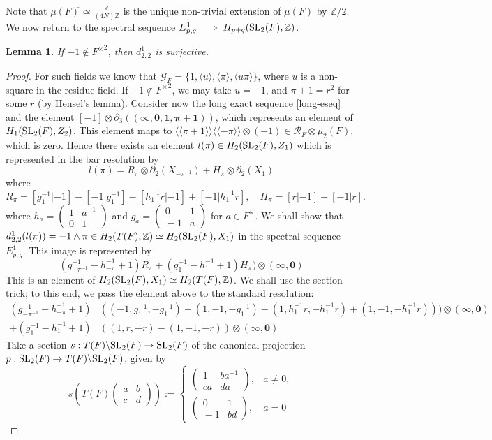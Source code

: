 \documentclass[11pt]{amsart}
\theoremstyle{definition}
\theoremstyle{plain}
\newtheorem{lem}[ntn]{Lemma}
\numberwithin{equation}{section}
\newcommand{\z}{\mathbb{Z}}
\newcommand{\GG}{\mathcal{G}}
\newcommand{\RR}{\mathcal{R}}
\newcommand{\lan}{\langle}
\newcommand{\ran}{\rangle}
\newcommand{\Lan}{\langle \! \langle}
\newcommand{\Ran}{\rangle \! \rangle}
\newcommand{\SL}{\mathit{{\rm SL}}}
\newcommand{\mtxx}[4]
{\left(\!\!
\begin{array}{cc}
\!\!#1 & \!\!#2\\
\!\!#3 & \!\!#4
\end{array}\!\!
\right)}
\begin{document}
Note that $\mu(F)^{\tilde{}}\simeq\frac{\z}{(4N)\z}$ is the unique non-trivial extension of $\mu(F)$ by $\z/2$. We now return to the spectral sequence $E^1_{p,q}\implies H_{p+q}(\SL_2(F),\z)$.
\begin{lem}
    \label{d122-surj}
    If $-1\notin {F^{\times}}^2$, then $d^1_{2,2}$ is surjective.
\end{lem}
\begin{proof}
    For such fields we know that $\GG_F=\{1,\lan u\ran,\lan\pi\ran,\lan u\pi\ran\}$, where $u$ is a non-square in the residue field.
    If $-1\notin {F^\times}^2$, we may take $u=-1$, and $\pi+1=r^2$ for some $r$ (by Hensel's lemma). Consider now the long exact sequence \eqref{long-eseq} and the element $[-1]\otimes\partial_3((\pmb{\infty},\pmb{0},\pmb{1},\pmb{\pi+1}))$, which represents an element of $H_1(\SL_2(F),Z_2)$. This element maps to $\Lan\pi+1\Ran\Lan-\pi\Ran\otimes(-1)\in\RR_F\otimes\mu_2(F)$, which is zero. Hence there exists an element $l(\pi)\in H_2(\SL_2(F),Z_1)$ which is represented in the bar resolution by
    \[
        l(\pi)=R_{\pi}\otimes\partial_2(X_{-\pi^{-1}})+H_{\pi}\otimes\partial_2(X_1)
    \]
    where
    \[
        R_{\pi}=[g_1^{-1}|-1]-[-1|g_1^{-1}]-[h_1^{-1}r|-1]+[-1|h_1^{-1}r],\quad H_{\pi}=[r|-1]-[-1|r].
    \]
    where $h_{a}=\mtxx{1}{a^{-1}}{0}{1}$ and $g_a=\mtxx{0}{1}{-1}{a}$ for $a\in F^{\times}$. We shall show that $d^1_{2,2}(l(\pi))=-1\wedge\pi\in H_2(T(F),\z)\simeq H_2(\SL_2(F),X_1)$ in the spectral sequence $E^1_{p,q}$. This image is represented by
    \[
        (g_{-\pi^{-1}}^{-1}-h_{-\pi}^{-1}+1)R_{\pi}+(g_1^{-1}-h_1^{-1}+1)H_{\pi})\otimes(\pmb{\infty},\pmb{0})
    \]
    This is an element of $H_2(\SL_2(F),X_1)\simeq H_2(T(F),\z)$. We shall use the section trick; to this end, we pass the element above to the standard resolution: 
    \begin{align*}
        (g_{-\pi^{-1}}^{-1}-h_{-\pi}^{-1}+1)&((-1,g_1^{-1},-g_1^{-1})-(1,-1,-g_1^{-1})-(1,h_1^{-1}r,-h_1^{-1}r)+(1,-1,-h_1^{-1}r)))\otimes(\pmb{\infty},\pmb{0})\\
        +(g_1^{-1}-h_1^{-1}+1)&((1,r,-r)-(1,-1,-r))\otimes(\pmb{\infty},\pmb{0})
    \end{align*}
    Take a section $s:T(F)\backslash\SL_2(F)\to \SL_2(F)$ of the canonical projection $p:\SL_2(F)\to T(F)\backslash\SL_2(F)$, given by
    \[
        s(T(F)\mtxx{a}{b}{c}{d}):=\begin{cases}
            \mtxx{1}{ba^{-1}}{ca}{da}, & a\neq 0,\\
            \mtxx{0}{1}{-1}{bd}, & a = 0

\end{cases}\]
\end{proof}
\end{document}
